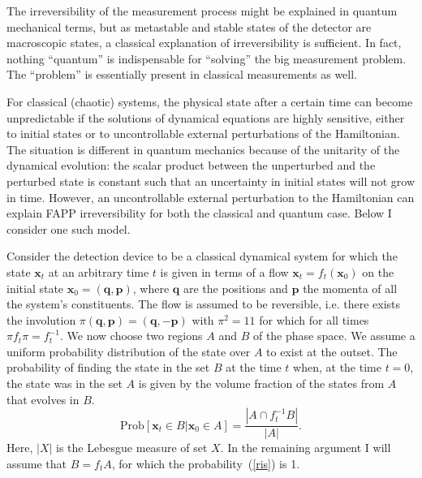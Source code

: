 \documentclass[12pt]{article}
\newcommand{\unit}{1\!\!1}
\begin{document}
The irreversibility of the measurement process might be explained in quantum mechanical terms, but as metastable and stable states of the detector are macroscopic states, a classical explanation of irreversibility is sufficient. In fact, nothing ``quantum'' is indispensable for ``solving'' the big measurement problem. The ``problem'' is essentially present in classical measurements as well.

For classical (chaotic) systems, the physical state after a certain time can become unpredictable if the solutions of dynamical equations are highly sensitive, either to initial states or to uncontrollable external perturbations of the Hamiltonian. The situation is different in quantum mechanics because of the unitarity of the dynamical evolution: the scalar product between the unperturbed and the perturbed state is constant such that an uncertainty in initial states will not grow in time. However, an uncontrollable external perturbation to the Hamiltonian can explain FAPP irreversibility for both the classical and quantum case. Below I consider one such model. 

Consider the detection device to be a classical dynamical system for which the state $\mathbf{x}_t$ at an arbitrary time $t$ is given in terms of a flow $\mathbf{x}_t = f_t(\mathbf{x}_0)$ on the initial state $\mathbf{x}_0 = (\mathbf{q},\mathbf{p})$, where $\mathbf{q}$ are the positions and $\mathbf{p}$ the momenta of all the system's constituents. The flow is assumed to be reversible, i.e. there exists the involution $\pi(\mathbf{q},\mathbf{p})=(\mathbf{q},-\mathbf{p})$ with $\pi^2=\unit$ for which for all times $\pi f_t \pi =f^{-1}_t$. We now choose two regions $A$ and $B$ of the phase space. We assume a uniform probability distribution of the state over $A$ to exist at the outset. The probability of finding the state in the set $B$ at the time $t$ when, at the time $t = 0$, the state was in the set $A$ is given by the volume fraction of the states from $A$ that evolves in $B$.
\begin{equation}
\mbox{Prob}[\mathbf{x}_t \in B| \mathbf{x}_0 \in A] = \frac{|A \cap f^{-1}_t B|}{|A|}. \label{ris}
\end{equation}
Here, $|X|$ is the Lebesgue measure of set $X$. In the remaining argument I will assume that $B = f_t A$, for which the probability~(\ref{ris}) is 1. 
\end{document}
